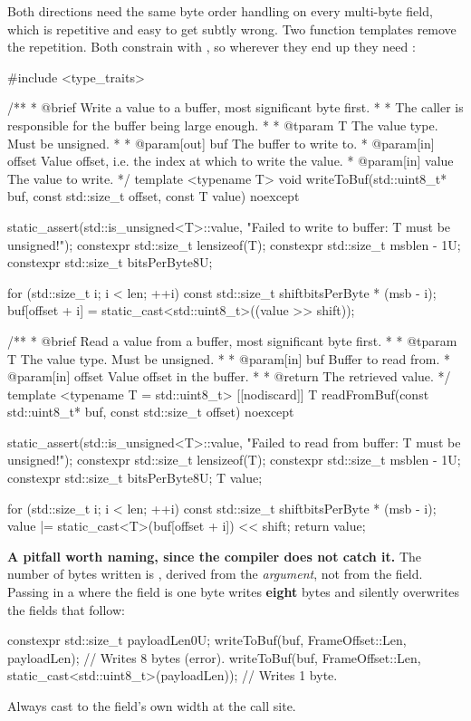 Both directions need the same byte order handling on every multi-byte field, which is repetitive and
easy to get subtly wrong. Two function templates remove the repetition. Both constrain  with
, so wherever they end up they need :

\begin{cppcode}
#include <type_traits>

/**
 * @brief Write a value to a buffer, most significant byte first.
 *
 *        The caller is responsible for the buffer being large enough.
 *
 * @tparam T The value type. Must be unsigned.
 *
 * @param[out] buf The buffer to write to.
 * @param[in] offset Value offset, i.e. the index at which to write the value.
 * @param[in] value  The value to write.
 */
template <typename T>
void writeToBuf(std::uint8_t* buf, const std::size_t offset, const T value) noexcept
{
    static_assert(std::is_unsigned<T>::value, "Failed to write to buffer: T must be unsigned!");
    constexpr std::size_t len{sizeof(T)};
    constexpr std::size_t msb{len - 1U};
    constexpr std::size_t bitsPerByte{8U};

    for (std::size_t i{}; i < len; ++i)
    {
        const std::size_t shift{bitsPerByte * (msb - i)};
        buf[offset + i] = static_cast<std::uint8_t>((value >> shift));
    }
}

/**
 * @brief Read a value from a buffer, most significant byte first.
 *
 * @tparam T The value type. Must be unsigned.
 *
 * @param[in] buf Buffer to read from.
 * @param[in] offset Value offset in the buffer.
 *
 * @return The retrieved value.
 */
template <typename T = std::uint8_t>
[[nodiscard]] T readFromBuf(const std::uint8_t* buf, const std::size_t offset) noexcept
{
    static_assert(std::is_unsigned<T>::value, "Failed to read from buffer: T must be unsigned!");
    constexpr std::size_t len{sizeof(T)};
    constexpr std::size_t msb{len - 1U};
    constexpr std::size_t bitsPerByte{8U};
    T value{};

    for (std::size_t i{}; i < len; ++i)
    {
        const std::size_t shift{bitsPerByte * (msb - i)};
        value |= static_cast<T>(buf[offset + i]) << shift;
    }
    return value;
}
\end{cppcode}

\begin{warning}
\textbf{A pitfall worth naming, since the compiler does not catch it.} The number of bytes written is
, derived from the \emph{argument}, not from the field. Passing in a
 where the field is one byte writes \textbf{eight} bytes and silently overwrites
the fields that follow:

\begin{cppcode}
constexpr std::size_t payloadLen{0U};
writeToBuf(buf, FrameOffset::Len, payloadLen);                            // Writes 8 bytes (error).
writeToBuf(buf, FrameOffset::Len, static_cast<std::uint8_t>(payloadLen)); // Writes 1 byte.
\end{cppcode}

Always cast to the field's own width at the call site.
\end{warning}

